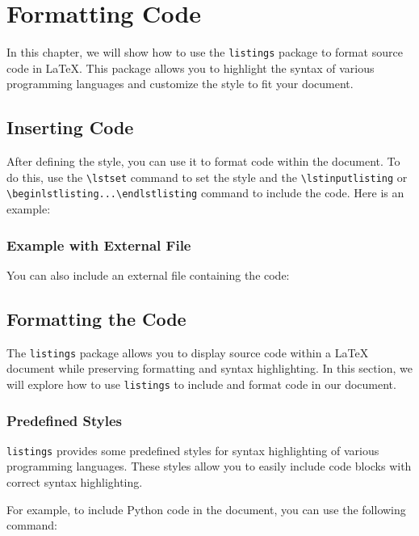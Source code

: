 \chapter{Formatting Code}

In this chapter, we will show how to use the \texttt{listings} package to format source code in LaTeX. This package allows you to highlight the syntax of various programming languages and customize the style to fit your document.

\section{Inserting Code}

After defining the style, you can use it to format code within the document. To do this, use the \texttt{\textbackslash lstset} command to set the style and the \texttt{\textbackslash lstinputlisting} or \texttt{\textbackslash begin{lstlisting}...\textbackslash end{lstlisting}} command to include the code. Here is an example:

\subsection{Example with External File} You can also include an external file containing the code:



\section{Formatting the Code}

The \texttt{listings} package allows you to display source code within a LaTeX document while preserving formatting and syntax highlighting. In this section, we will explore how to use \texttt{listings} to include and format code in our document.

\subsection{Predefined Styles}

\texttt{listings} provides some predefined styles for syntax highlighting of various programming languages. These styles allow you to easily include code blocks with correct syntax highlighting.

For example, to include Python code in the document, you can use the following command:

